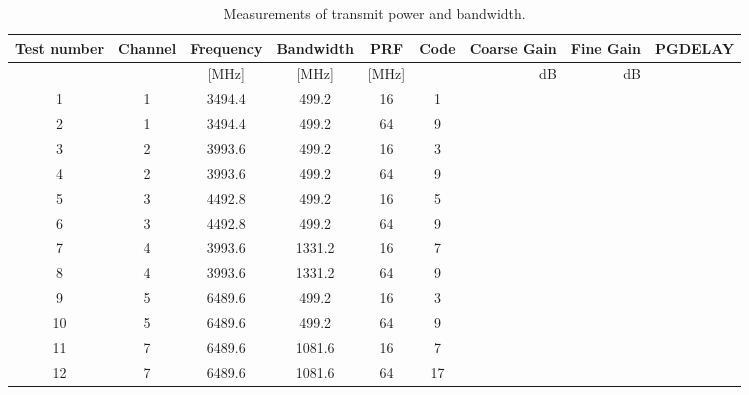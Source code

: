 \documentclass[journal,comsoc]{IEEEtran}
\begin{document}
\begin{table}[h!]
	\centering
	\begin{tabular}{|c|c|c|c|c|c|r|r|r|}
	\hline
	\textbf{Test number} & \textbf{Channel} & \textbf{Frequency} & \textbf{Bandwidth} & \textbf{PRF} & \textbf{Code} & \textbf{Coarse Gain} & \textbf{Fine Gain} & \textbf{PGDELAY}\\ \hline
	& & [MHz] & [MHz] & [MHz] & & dB & dB & \\\hline\hline
	 1 & 1 & 3494.4 & 499.2  & 16 & 1 & & &  \\ \hline
   2 & 1 & 3494.4 & 499.2  & 64 & 9 & & &  \\ \hline
	 3 & 2 & 3993.6 & 499.2  & 16 & 3 & & &  \\ \hline
	 4 & 2 & 3993.6 & 499.2  & 64 & 9 & & &  \\ \hline
	 5 & 3 & 4492.8 & 499.2  & 16 & 5 & & &  \\ \hline
	 6 & 3 & 4492.8 & 499.2  & 64 & 9 & & & \\ \hline
	 7 & 4 & 3993.6 & 1331.2 & 16 & 7 & & & \\ \hline
	 8 & 4 & 3993.6 & 1331.2 & 64 & 9 & & & \\ \hline
	 9 & 5 & 6489.6 & 499.2  & 16 & 3 & & & \\ \hline
	10 & 5 & 6489.6 & 499.2  & 64 & 9 & & & \\ \hline
	11 & 7 & 6489.6 & 1081.6 & 16 & 7 & & & \\ \hline
	12 & 7 & 6489.6 & 1081.6 & 64 &17 & & & \\ \hline
	\end{tabular}
	\caption{Measurements of transmit power and bandwidth.}
	\label{tab:txpowermeasurements}
\end{table}
\end{document}
